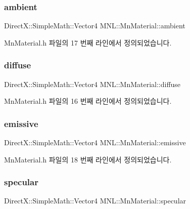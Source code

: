 \subsubsection{\texorpdfstring{ambient}{ambient}}
{\footnotesize\ttfamily Direct\+X\+::\+Simple\+Math\+::\+Vector4 M\+N\+L\+::\+Mn\+Material\+::ambient}



Mn\+Material.\+h 파일의 17 번째 라인에서 정의되었습니다.

\mbox{\label{class_m_n_l_1_1_mn_material_a0286b31f8f107f8c538f0db9a18acaa2}} 
\subsubsection{\texorpdfstring{diffuse}{diffuse}}
{\footnotesize\ttfamily Direct\+X\+::\+Simple\+Math\+::\+Vector4 M\+N\+L\+::\+Mn\+Material\+::diffuse}



Mn\+Material.\+h 파일의 16 번째 라인에서 정의되었습니다.

\mbox{\label{class_m_n_l_1_1_mn_material_a58bf008b04d0245f6470da8ca3d4d735}} 
\subsubsection{\texorpdfstring{emissive}{emissive}}
{\footnotesize\ttfamily Direct\+X\+::\+Simple\+Math\+::\+Vector4 M\+N\+L\+::\+Mn\+Material\+::emissive}



Mn\+Material.\+h 파일의 18 번째 라인에서 정의되었습니다.

\mbox{\label{class_m_n_l_1_1_mn_material_a7f083df1bc6578e41917bd4a237448bf}} 
\subsubsection{\texorpdfstring{specular}{specular}}
{\footnotesize\ttfamily Direct\+X\+::\+Simple\+Math\+::\+Vector4 M\+N\+L\+::\+Mn\+Material\+::specular}



